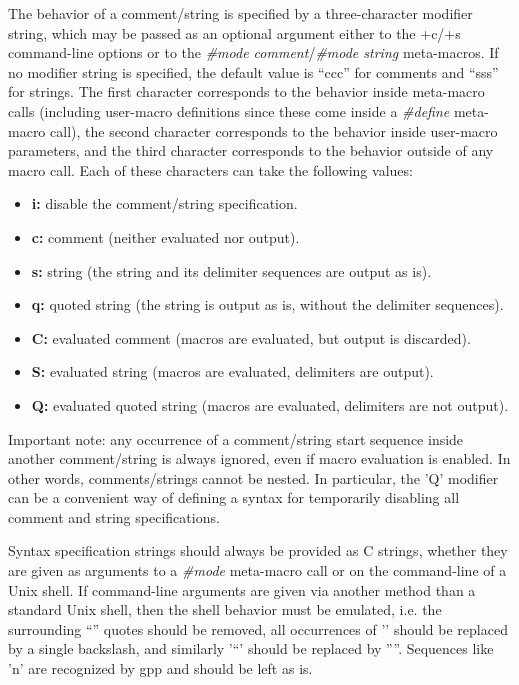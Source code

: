 The behavior of a comment/string is specified by a three-character modifier
string, which may be passed as an optional argument either to the +c/+s
command-line options or to the {\it \#mode comment}/{\it \#mode string}
meta-macros. If no modifier string is specified, the default value is ``ccc''
for comments and ``sss'' for strings. The first character corresponds to the
behavior inside meta-macro calls (including user-macro definitions since these
come inside a {\it \#define} meta-macro call), the second character
corresponds to the behavior inside user-macro parameters, and the third
character corresponds to the behavior outside of any macro call. Each of these
characters can take the following values: 

\begin{itemize}

\item {\bf i:} disable the comment/string specification. 

\item {\bf c:} comment (neither evaluated nor output). 

\item {\bf s:} string (the string and its delimiter sequences are output as
is). 

\item {\bf q:} quoted string (the string is output as is, without the
delimiter sequences). 

\item {\bf C:} evaluated comment (macros are evaluated, but output is
discarded). 

\item {\bf S:} evaluated string (macros are evaluated, delimiters are output).


\item {\bf Q:} evaluated quoted string (macros are evaluated, delimiters are
not output).
\end{itemize}

Important note: any occurrence of a comment/string start sequence inside
another comment/string is always ignored, even if macro evaluation is enabled.
In other words, comments/strings cannot be nested. In particular, the 'Q'
modifier can be a convenient way of defining a syntax for temporarily
disabling all comment and string specifications. 

Syntax specification strings should always be provided as C strings, whether
they are given as arguments to a {\it \#mode} meta-macro call or on the
command-line of a Unix shell. If command-line arguments are given via another
method than a standard Unix shell, then the shell behavior must be emulated,
i.e. the surrounding ``'' quotes should be removed, all occurrences of
'{\htmlBackslash}{\htmlBackslash}' should be replaced by a single backslash,
and similarly '{\htmlBackslash}``' should be replaced by ''''. Sequences like
'{\htmlBackslash}n' are recognized by gpp and should be left as is. 

